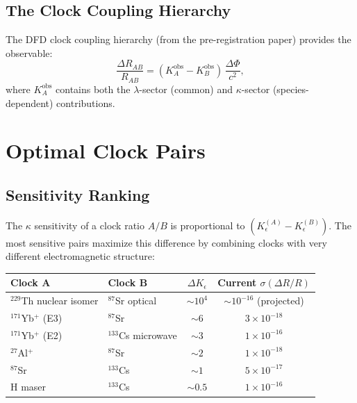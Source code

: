 \documentclass[11pt]{article}
\newcommand{\ee}[1]{\times 10^{#1}}
\begin{document}
\subsection{The Clock Coupling Hierarchy}

The DFD clock coupling hierarchy (from the pre-registration
paper) provides the observable:
\begin{equation}
\frac{\Delta R_{AB}}{R_{AB}}
= (K_A^{\text{obs}} - K_B^{\text{obs}})\,\frac{\Delta\Phi}{c^2},
\end{equation}
where $K_A^{\text{obs}}$ contains both the $\lambda$-sector (common)
and $\kappa$-sector (species-dependent) contributions.

\section{Optimal Clock Pairs}
\label{sec:clock-pairs}

\subsection{Sensitivity Ranking}

The $\kappa$ sensitivity of a clock ratio $A/B$ is proportional to
$(K_\epsilon^{(A)} - K_\epsilon^{(B)})$.  The most sensitive pairs
maximize this difference by combining clocks with very different
electromagnetic structure:

\begin{center}
\begin{tabular}{llcc}
\toprule
\textbf{Clock A} & \textbf{Clock B} & $\Delta K_\epsilon$ &
\textbf{Current $\sigma(\Delta R/R)$} \\
\midrule
$^{229}$Th nuclear isomer & $^{87}$Sr optical & $\sim 10^4$ &
  $\sim 10^{-16}$ (projected) \\
$^{171}$Yb$^+$ (E3) & $^{87}$Sr & $\sim 6$ &
  $3\ee{-18}$ \\
$^{171}$Yb$^+$ (E2) & $^{133}$Cs microwave & $\sim 3$ &
  $1\ee{-16}$ \\
$^{27}$Al$^+$ & $^{87}$Sr & $\sim 2$ &
  $1\ee{-18}$ \\
$^{87}$Sr & $^{133}$Cs & $\sim 1$ &
  $5\ee{-17}$ \\
H maser & $^{133}$Cs & $\sim 0.5$ &
  $1\ee{-16}$ \\
\bottomrule
\end{tabular}
\end{center}
\end{document}
